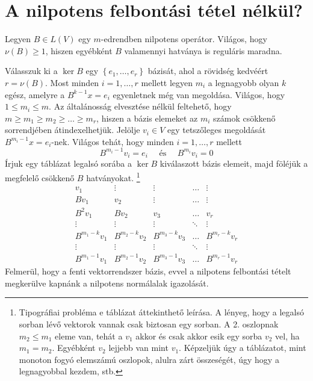 \documentclass[9pt, a4paper, showtrims]{memoir}
\theoremstyle{plain}
\theoremstyle{remark}
\theoremstyle{definition}
\begin{document}
\section{A nilpotens felbontási tétel nélkül?}
Legyen $B\in L\left( V \right)$ egy $m$-edrendben nilpotens operátor.
Világos, hogy $\nu\left( B \right)\geq 1$,
hiszen egyébként $B$ valamennyi hatványa is reguláris maradna.

Válasszuk ki a $\ker B$ egy
$\left\{ e_1,\ldots,e_r \right\}$ bázisát,
ahol a rövidség kedvéért $r=\nu\left( B \right)$.
Most minden $i=1,\ldots,r$ mellett legyen $m_i$ a legnagyobb olyan $k$ egész, amelyre a
$B^{k-1}x=e_i$ egyenletnek még van megoldása.
Világos, hogy $1\leq m_i\leq m$.
Az általánosság elvesztése nélkül feltehető, hogy
$m\geq m_1\geq m_2\geq \dots \geq m_r$, hiszen a bázis elemeket az $m_i$ számok
csökkenő sorrendjében átindexelhetjük.
Jelölje $v_i\in V$ egy tetszőleges megoldását $B^{m_i-1}x=e_i$-nek.
Világos tehát, hogy minden $i=1,\ldots,r$ mellett
\[
	B^{m_i-1}v_i=e_i \quad\text{ és }\quad B^{m_i}v_i=0
\]
Írjuk egy táblázat legalsó sorába a $\ker B$ kiválaszott bázis elemeit,
majd föléjük a megfelelő csökkenő $B$ hatványokat.%
\footnote{Tipográfiai probléma e táblázat áttekinthető leírása.
	A lényeg, hogy a legalsó sorban lévő vektorok vannak csak biztosan egy sorban. A 2. oszlopnak $m_2\leq m_1$
	eleme van, tehát a $v_1$ akkor és csak akkor esik egy sorba $v_2$ vel, ha $m_1=m_2$. Egyébként $v_2$ lejjebb van mint $v_1$. Képzeljük úgy a táblázatot, mint monoton fogyó elemszámú oszlopok, alulra zárt összeségét, úgy hogy a legnagyobbal kezdem, stb.}
\[
	\begin{matrix}
		v_1          & \vdots       & \vdots       & \dots  & \vdots       \\
		Bv_1         & v_2          & \vdots       & \dots  & \vdots       \\
		B^2v_1       & Bv_2         & v_3          & \dots  & v_r          \\
		\vdots       & \vdots       & \vdots       & \ddots & \vdots       \\
		B^{m_1-k}v_1 & B^{m_2-k}v_2 & B^{m_3-k}v_3 & \dots  & B^{m_r-k}v_r \\
		\vdots       & \vdots       & \vdots       & \ddots & \vdots       \\
		B^{m_1-1}v_1 & B^{m_2-1}v_2 & B^{m_3-1}v_3 & \dots  & B^{m_r-1}v_r
	\end{matrix}
\]
Felmerül, hogy a fenti vektorrendszer bázis, evvel a nilpotens felbontási tételt megkerülve
kapnánk a nilpotens normálalak igazolását.
\end{document}
